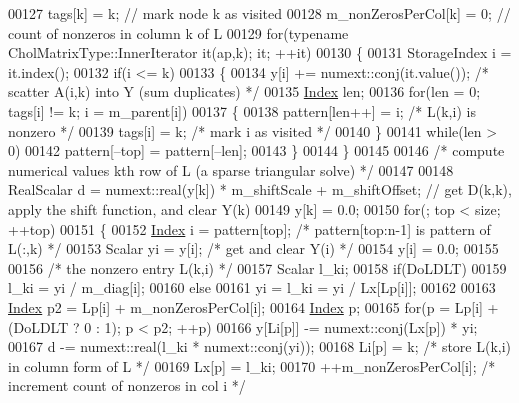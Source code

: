 \begin{DoxyCode}
00127     tags[k] = k;                    \textcolor{comment}{// mark node k as visited}
00128     m\_nonZerosPerCol[k] = 0;        \textcolor{comment}{// count of nonzeros in column k of L}
00129     \textcolor{keywordflow}{for}(\textcolor{keyword}{typename} CholMatrixType::InnerIterator it(ap,k); it; ++it)
00130     \{
00131       StorageIndex i = it.index();
00132       \textcolor{keywordflow}{if}(i <= k)
00133       \{
00134         y[i] += numext::conj(it.value());            \textcolor{comment}{/* scatter A(i,k) into Y (sum duplicates) */}
00135         \hyperlink{namespace_eigen_a62e77e0933482dafde8fe197d9a2cfde}{Index} len;
00136         \textcolor{keywordflow}{for}(len = 0; tags[i] != k; i = m\_parent[i])
00137         \{
00138           pattern[len++] = i;     \textcolor{comment}{/* L(k,i) is nonzero */}
00139           tags[i] = k;            \textcolor{comment}{/* mark i as visited */}
00140         \}
00141         \textcolor{keywordflow}{while}(len > 0)
00142           pattern[--top] = pattern[--len];
00143       \}
00144     \}
00145 
00146     \textcolor{comment}{/* compute numerical values kth row of L (a sparse triangular solve) */}
00147 
00148     RealScalar d = numext::real(y[k]) * m\_shiftScale + m\_shiftOffset;    \textcolor{comment}{// get D(k,k), apply the shift
       function, and clear Y(k)}
00149     y[k] = 0.0;
00150     \textcolor{keywordflow}{for}(; top < size; ++top)
00151     \{
00152       \hyperlink{namespace_eigen_a62e77e0933482dafde8fe197d9a2cfde}{Index} i = pattern[top];       \textcolor{comment}{/* pattern[top:n-1] is pattern of L(:,k) */}
00153       Scalar yi = y[i];             \textcolor{comment}{/* get and clear Y(i) */}
00154       y[i] = 0.0;
00155 
00156       \textcolor{comment}{/* the nonzero entry L(k,i) */}
00157       Scalar l\_ki;
00158       \textcolor{keywordflow}{if}(DoLDLT)
00159         l\_ki = yi / m\_diag[i];
00160       \textcolor{keywordflow}{else}
00161         yi = l\_ki = yi / Lx[Lp[i]];
00162 
00163       \hyperlink{namespace_eigen_a62e77e0933482dafde8fe197d9a2cfde}{Index} p2 = Lp[i] + m\_nonZerosPerCol[i];
00164       \hyperlink{namespace_eigen_a62e77e0933482dafde8fe197d9a2cfde}{Index} p;
00165       \textcolor{keywordflow}{for}(p = Lp[i] + (DoLDLT ? 0 : 1); p < p2; ++p)
00166         y[Li[p]] -= numext::conj(Lx[p]) * yi;
00167       d -= numext::real(l\_ki * numext::conj(yi));
00168       Li[p] = k;                          \textcolor{comment}{/* store L(k,i) in column form of L */}
00169       Lx[p] = l\_ki;
00170       ++m\_nonZerosPerCol[i];              \textcolor{comment}{/* increment count of nonzeros in col i */}

\end{DoxyCode}
